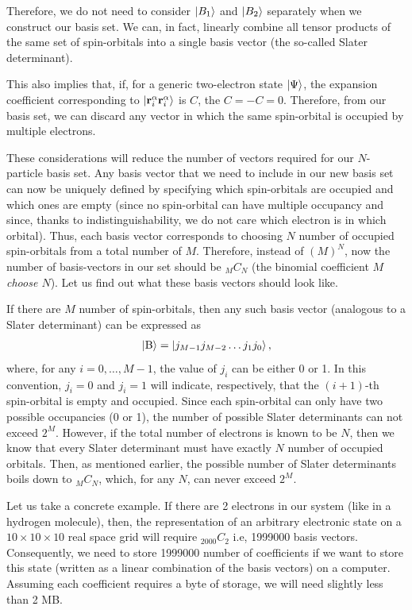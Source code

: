 \documentclass[12pt,oneside]{book}
\begin{document}
\begin{enumerate}
    Therefore, we do not need to consider $\ket{B_1}$ and $\ket{B_2}$ separately when we construct our basis set. We can, in fact, linearly combine all tensor products of the same set of spin-orbitals into a single basis vector (the so-called Slater determinant).

    This also implies that, if, for a generic two-electron state $\ket{\Psi}$, the expansion coefficient corresponding to $\ket{\mathbf{r}_i^\alpha\mathbf{r}_i^\alpha}$ is $C$, the $C=-C=0$. Therefore, from our basis set, we can discard any vector in which the same spin-orbital is occupied by multiple electrons.
\end{enumerate}

These considerations will reduce the number of vectors required for our $N$-particle basis set. Any basis vector that we need to include in our new basis set can now be uniquely defined by specifying which spin-orbitals are occupied and which ones are empty (since no spin-orbital can have multiple occupancy and since, thanks to indistinguishability, we do not care which electron is in which orbital). Thus, each basis vector corresponds to choosing $N$ number of occupied spin-orbitals from a total number of $M$. Therefore, instead of $(M)^N$, now the number of basis-vectors in our set should be $_{M}C_N$ (the binomial coefficient \textit{$M$ choose $N$}). Let us find out what these basis vectors should look like.

If there are $M$ number of spin-orbitals, then any such basis vector (analogous to a Slater determinant) can be expressed as
\begin{align}\label{SD_OccupationRepresentation}
    \ket{\mathrm{B}}=\ket{j_{M-1}j_{M-2}\hdots j_1 j_0},
\end{align}
where, for any $i=0,\hdots,M-1$, the value of $j_i$ can be either 0 or 1. In this convention, $j_i=0$ and $j_i=1$ will indicate, respectively, that the $(i+1)$-th spin-orbital is empty and occupied. Since each spin-orbital can only have two possible occupancies (0 or 1), the number of possible Slater determinants can not exceed $2^M$. However, if the total number of electrons is known to be $N$, then we know that every Slater determinant must have exactly $N$ number of occupied orbitals. Then, as mentioned earlier, the possible number of Slater determinants boils down to $_MC_N$, which, for any $N$, can never exceed $2^M$.

Let us take a concrete example. If there are 2 electrons in our system (like in a hydrogen molecule), then, the representation of an arbitrary electronic state on a $10 \times 10 \times 10$ real space grid will require $_{2000}C_2$ i.e, 1999000 basis vectors. Consequently, we need to store 1999000 number of coefficients if we want to store this state (written as a linear combination of the basis vectors) on a computer. Assuming each coefficient requires a byte of storage, we will need slightly less than 2 MB. 
\end{document}
